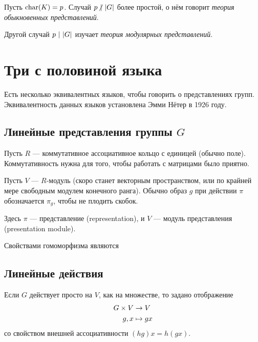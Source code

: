 Пусть $\operatorname{char}(K) = p$.
Случай $p \;\!{\not|}~ |G|$ более простой, о нём говорит \textit{теория обыкновенных представлений}.

Другой случай $p ~|~ |G|$ изучает \textit{теория модулярных представлений}.


\section{Три с половиной языка}
Есть несколько эквивалентных языков, чтобы говорить о представлениях групп.
Эквивалентность данных языков установлена Эмми Нётер в 1926 году.

\subsection{Линейные представления группы $G$}
Пусть $R$ --- коммутативное ассоциативное кольцо с единицей (обычно поле).
Коммутативность нужна для того, чтобы работать с матрицами было приятно.

Пусть $V$ --- $R$-модуль (скоро станет векторным пространством, или по крайней мере свободным модулем конечного ранга).
Обычно образ $g$ при действии $\pi$ обозначается $\pi_g$, чтобы не плодить скобок.

Здесь $\pi$ --- представление (representation), и $V$ --- модуль представления (presentation module).

Свойствами гомоморфизма являются

\subsection{Линейные действия}
Если $G$ действует просто на $V$, как на множестве, то задано отображение
\begin{align*}
    G \times V &\rightarrow V \\ g,x&\mapsto gx
\end{align*}
со свойством внешней ассоциативности $(hg)x = h(gx)$.


